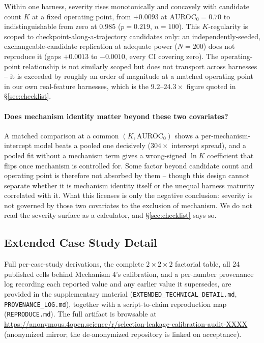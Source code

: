 \documentclass{article}
\begin{document}
Within one harness, severity rises monotonically and concavely with candidate
count $K$ at a fixed operating point, from $+0.0093$ at
$\text{AUROC}_0=0.70$ to indistinguishable from zero at $0.985$
($p=0.219$, $n=100$). This $K$-regularity is scoped to
checkpoint-along-a-trajectory candidates only: an independently-seeded,
exchangeable-candidate replication at adequate power ($N=200$) does not
reproduce it (gaps $+0.0013$ to $-0.0010$, every CI covering zero). The
operating-point relationship is not similarly scoped but does not transport
across harnesses -- it is exceeded by roughly an order of magnitude at a
matched operating point in our own real-feature harnesses, which is the
$9.2$--$24.3\times$ figure quoted in \S\ref{sec:checklist}.

\paragraph{Does mechanism identity matter beyond these two covariates?} A
matched comparison at a common $(K,\text{AUROC}_0)$ shows a
per-mechanism-intercept model beats a pooled one decisively ($304\times$
intercept spread), and a pooled fit without a mechanism term gives a
wrong-signed $\ln K$ coefficient that flips once mechanism is controlled for.
Some factor beyond candidate count and operating point is therefore not
absorbed by them -- though this design cannot separate whether it is mechanism
identity itself or the unequal harness maturity correlated with it. What this
licenses is only the negative conclusion: severity is not governed by those two
covariates to the exclusion of mechanism. We do not read the severity surface
as a calculator, and \S\ref{sec:checklist} says so.

\subsection{Extended Case Study Detail}
\label{app:cases}
Full per-case-study derivations, the complete $2\times2\times2$ factorial
table, all 24 published
cells behind Mechanism 4's calibration, and a per-number provenance log
recording each reported value and any earlier value it supersedes, are
provided in the supplementary material
(\texttt{EXTENDED\_TECHNICAL\_DETAIL.md}, \texttt{PROVENANCE\_LOG.md}),
together with a script-to-claim reproduction map (\texttt{REPRODUCE.md}).
The full artifact is browsable at
\url{https://anonymous.4open.science/r/selection-leakage-calibration-audit-XXXX}
(anonymized mirror; the de-anonymized repository is linked on acceptance).
\end{document}
